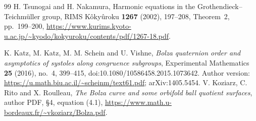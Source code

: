 \documentclass[11pt,a4paper]{article}
\theoremstyle{definition}
\theoremstyle{remark}
\begin{document}
\begin{thebibliography}{99}
H. Tsunogai and H. Nakamura, Harmonic equations in the
Grothendieck--Teichm\"uller group, RIMS K\^oky\^uroku
\textbf{1267} (2002), 197--208, Theorem~2, pp.~199--200,
\url{https://www.kurims.kyoto-u.ac.jp/~kyodo/kokyuroku/contents/pdf/1267-18.pdf}.


K. Katz, M. Katz, M. M. Schein and U. Vishne,
\emph{Bolza quaternion order and asymptotics of systoles along
congruence subgroups}, Experimental Mathematics \textbf{25}
(2016), no.~4, 399--415,
doi:10.1080/10586458.2015.1073642.
Author version: \url{https://u.math.biu.ac.il/~scheinm/text61.pdf};
arXiv:1405.5454.
V. Koziarz, C. Rito and X. Roulleau,
\emph{The Bolza curve and some orbifold ball quotient surfaces},
author PDF, \S4, equation (4.1),
\url{https://www.math.u-bordeaux.fr/~vkoziarz/Bolza.pdf}.


\end{thebibliography}
\end{document}
